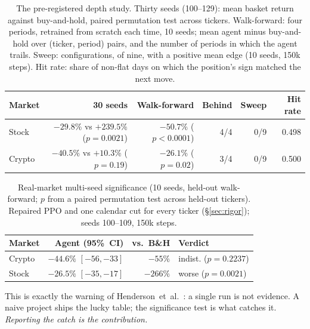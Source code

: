 \documentclass[10pt,twocolumn]{article}
\newcommand{\pc}{\%}  %
\begin{document}
\begin{table}[t]\centering\small
\caption{The pre-registered depth study. Thirty seeds (100--129): mean basket return against buy-and-hold, paired permutation test across tickers. Walk-forward: four periods, retrained from scratch each time, 10 seeds; mean agent minus buy-and-hold over (ticker, period) pairs, and the number of periods in which the agent trails. Sweep: configurations, of nine, with a positive mean edge (10 seeds, 150k steps). Hit rate: share of non-flat days on which the position's sign matched the next move.}
\label{tab:depth}
\begin{tabular}{lrrrrr}
\toprule
Market & 30 seeds & Walk-forward & Behind & Sweep & Hit rate\\
\midrule
Stock  & $-29.8\pc$ vs $+239.5\pc$ ($p{=}0.0021$) & $-50.7\pc$ ($p<0.0001$) & 4/4 & 0/9 & 0.498\\
Crypto & $-40.5\pc$ vs $+10.3\pc$ ($p{=}0.19$) & $-26.1\pc$ ($p{=}0.02$) & 3/4 & 0/9 & 0.500\\
\bottomrule
\end{tabular}
\end{table}

\begin{table}[t]\centering\small
\caption{Real-market multi-seed significance (10 seeds, held-out walk-forward; $p$ from a paired permutation test across held-out tickers). Repaired PPO and one calendar cut for every ticker (\S\ref{sec:rigor}); seeds 100--109, 150k steps.}
\label{tab:real}
\begin{tabular}{@{}lrrl@{}}
\toprule
Market & Agent (95\pc\ CI) & vs.\ B\&H & Verdict\\
\midrule
Crypto & $-44.6\pc$ $[-56,-33]$ & $-55\pc$ & indist. ($p{=}0.2237$)\\
Stock  & $-26.5\pc$ $[-35,-17]$ & $-266\pc$ & worse ($p{=}0.0021$)\\
\bottomrule
\end{tabular}
\end{table}

This is exactly the warning of Henderson~et~al.\ \cite{henderson2018}: a single run is not evidence.
A naive project ships the lucky table; the significance test is what catches it.
\emph{Reporting the catch is the contribution.}
\end{document}

